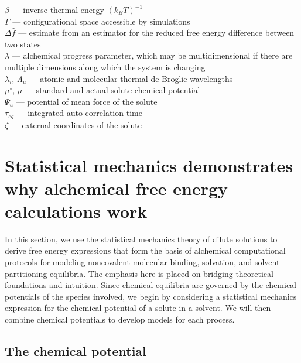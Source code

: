 \documentclass[9pt,bestpractices]{livecoms}
\begin{document}
\begin{tcolorbox}[title=List of Symbols, colback=green!10!white]
$\beta$ --- inverse thermal energy $(k_B T)^{-1}$ \\
$\Gamma$ --- configurational space accessible by simulations \\
$\Delta \hat{f}$ --- estimate from an estimator for the reduced free energy difference between two states\\
$\lambda$ --- alchemical progress parameter, which may be multidimensional if there are multiple dimensions along which the system is changing \\
$\lambda_i$, $\Lambda_u$ --- atomic and molecular thermal de Broglie wavelengths \\
$\mu^\circ$, $\mu$ --- standard and actual solute chemical potential \\
$\Psi_u$ --- potential of mean force of the solute \\
$\tau _{eq}$ --- integrated auto-correlation time\\
$\zeta$ --- external coordinates of the solute
\end{tcolorbox}


\section{Statistical mechanics demonstrates why alchemical free energy calculations work}
\label{sec:theory}


In this section, we use the statistical mechanics theory of dilute solutions to derive free energy expressions that form the basis of alchemical computational protocols for modeling noncovalent molecular binding, solvation, and solvent partitioning equilibria. The emphasis here is placed on bridging theoretical foundations and intuition. Since chemical equilibria are governed by the chemical potentials of the species involved, we begin by considering a statistical mechanics expression for the chemical potential of a solute in a solvent. We will then combine chemical potentials to develop models for each process.

\subsection{The chemical potential}
\label{sec:chemical_potential}
\end{document}
